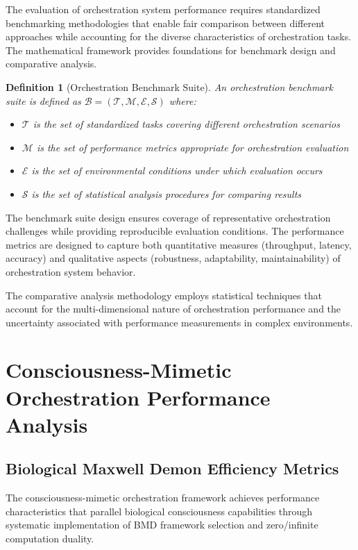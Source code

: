 \documentclass[12pt,a4paper]{article}
\newtheorem{definition}[theorem]{Definition}
\begin{document}
The evaluation of orchestration system performance requires standardized benchmarking methodologies that enable fair comparison between different approaches while accounting for the diverse characteristics of orchestration tasks. The mathematical framework provides foundations for benchmark design and comparative analysis.

\begin{definition}[Orchestration Benchmark Suite]
An orchestration benchmark suite is defined as $\mathcal{B} = (\mathcal{T}, \mathcal{M}, \mathcal{E}, \mathcal{S})$ where:
\begin{itemize}
\item $\mathcal{T}$ is the set of standardized tasks covering different orchestration scenarios
\item $\mathcal{M}$ is the set of performance metrics appropriate for orchestration evaluation
\item $\mathcal{E}$ is the set of environmental conditions under which evaluation occurs
\item $\mathcal{S}$ is the set of statistical analysis procedures for comparing results
\end{itemize}
\end{definition}

The benchmark suite design ensures coverage of representative orchestration challenges while providing reproducible evaluation conditions. The performance metrics are designed to capture both quantitative measures (throughput, latency, accuracy) and qualitative aspects (robustness, adaptability, maintainability) of orchestration system behavior.

The comparative analysis methodology employs statistical techniques that account for the multi-dimensional nature of orchestration performance and the uncertainty associated with performance measurements in complex environments.

\section{Consciousness-Mimetic Orchestration Performance Analysis}

\subsection{Biological Maxwell Demon Efficiency Metrics}

The consciousness-mimetic orchestration framework achieves performance characteristics that parallel biological consciousness capabilities through systematic implementation of BMD framework selection and zero/infinite computation duality.
\end{document}

